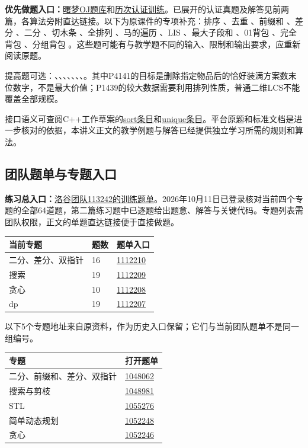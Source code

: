 \textbf{优先做题入口：}\href{https://oj.shumeng.tech/p}{曙梦OJ题库}和\href{https://oj.shumeng.tech/training/68330d72efce6d5ac2765a62}{历次认证训练}。已展开的认证真题及解答见前两篇，各算法旁附直达链接。以下为原课件的专项补充：排序 、去重 、前缀和 、差分 、二分 、切木条 、全排列 、马的遍历 、LIS 、最大子段和 、01背包 、完全背包 、分组背包 。这些题可能有与教学题不同的输入、限制和输出要求，应重新阅读原题。

提高题可选：、、、、、、、。其中P4141的目标是删除指定物品后的恰好装满方案数末位数字，不是最大价值；P1439的较大数据需要利用排列性质，普通二维LCS不能覆盖全部规模。

接口语义可查阅C++工作草案的\href{https://eel.is/c++draft/sort}{sort条目}和\href{https://eel.is/c++draft/alg.unique}{unique条目}。平台原题和标准文档是进一步核对的依据，本讲义正文的教学例题与解答已经提供独立学习所需的规则和算法。

\subsection{团队题单与专题入口}
\textbf{练习总入口：}\href{https://www.luogu.com.cn/team/113242/training}{洛谷团队113242的训练题单}。2026年10月11日已登录核对当前四个专题的全部64道题，第二篇练习题中已逐题给出题意、解答与关键代码。专题列表需团队权限，正文的单题直达链接便于直接做题。
\begin{longtable}{P{7cm}P{2cm}P{5cm}}
\toprule 当前专题 & 题数 & 题单入口\\\midrule\endhead
二分、差分、双指针 & 16 & \href{https://www.luogu.com.cn/training/1112210}{1112210}\\
搜索 & 19 & \href{https://www.luogu.com.cn/training/1112209}{1112209}\\
贪心 & 10 & \href{https://www.luogu.com.cn/training/1112208}{1112208}\\
dp & 19 & \href{https://www.luogu.com.cn/training/1112207}{1112207}\\
\bottomrule\end{longtable}
以下5个专题地址来自原资料，作为历史入口保留；它们与当前团队题单不是同一组编号。
\begin{longtable}{P{8cm}P{6cm}}
\toprule 专题 & 打开题单\\\midrule\endhead
二分、前缀和、差分、双指针 & \href{https://www.luogu.com.cn/training/1048062}{1048062}\\
搜索与剪枝 & \href{https://www.luogu.com.cn/training/1048981}{1048981}\\
STL & \href{https://www.luogu.com.cn/training/1055276}{1055276}\\
简单动态规划 & \href{https://www.luogu.com.cn/training/1052248}{1052248}\\
贪心 & \href{https://www.luogu.com.cn/training/1052246}{1052246}\\
\bottomrule\end{longtable}
